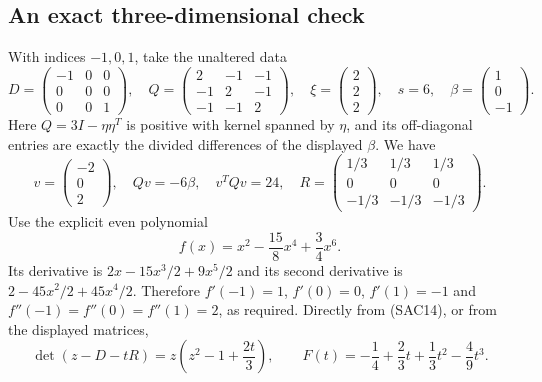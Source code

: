 \subsection{An exact three-dimensional check}

With indices $-1,0,1$, take the unaltered data
\begin{equation}\tag{SAC17}
 D=\begin{pmatrix}-1&0&0\\0&0&0\\0&0&1\end{pmatrix},\quad
 Q=\begin{pmatrix}2&-1&-1\\-1&2&-1\\-1&-1&2\end{pmatrix},\quad
 \xi=\begin{pmatrix}2\\2\\2\end{pmatrix},\quad
 s=6,\quad\beta=\begin{pmatrix}1\\0\\-1\end{pmatrix}.
\end{equation}
Here $Q=3I-\eta\eta^T$ is positive with kernel spanned by
$\eta$, and its off-diagonal entries are exactly the divided
differences of the displayed $\beta$. We have
\begin{equation}\tag{SAC18}
 v=\begin{pmatrix}-2\\0\\2\end{pmatrix},\quad Qv=-6\beta,
 \quad v^TQv=24,\quad
 R=\begin{pmatrix}1/3&1/3&1/3\\0&0&0\\-1/3&-1/3&-1/3\end{pmatrix}.
\end{equation}
Use the explicit even polynomial
\begin{equation}\tag{SAC19}
 f(x)=x^2-\frac{15}{8}x^4+\frac34x^6.
\end{equation}
Its derivative is $2x-15x^3/2+9x^5/2$ and its second
derivative is $2-45x^2/2+45x^4/2$. Therefore
$f'(-1)=1$, $f'(0)=0$, $f'(1)=-1$ and
$f''(-1)=f''(0)=f''(1)=2$, as required.
Directly from (SAC14), or from the displayed matrices,
\begin{equation}\tag{SAC20}
 \det(z-D-tR)=z\left(z^2-1+\frac{2t}{3}\right),\qquad
 F(t)=-\frac14+\frac23t+\frac13t^2-\frac49t^3.
\end{equation}

